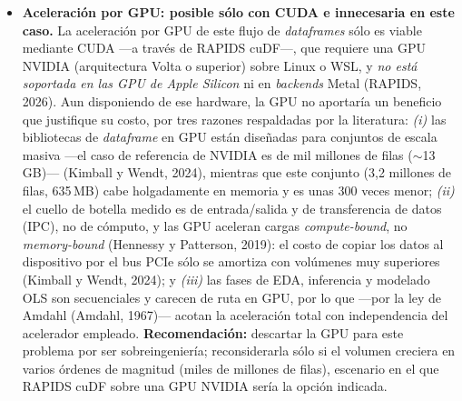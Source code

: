 \documentclass[12pt,letterpaper]{article}
\begin{document}
\begin{itemize}
    \item \textbf{Aceleración por GPU: posible sólo con CUDA e innecesaria en este caso.} La aceleración por GPU de este flujo de \textit{dataframes} sólo es viable mediante CUDA —a través de RAPIDS cuDF—, que requiere una GPU NVIDIA (arquitectura Volta o superior) sobre Linux o WSL, y \textit{no está soportada en las GPU de Apple Silicon} ni en \textit{backends} Metal (RAPIDS, 2026). Aun disponiendo de ese hardware, la GPU no aportaría un beneficio que justifique su costo, por tres razones respaldadas por la literatura: \textit{(i)} las bibliotecas de \textit{dataframe} en GPU están diseñadas para conjuntos de escala masiva —el caso de referencia de NVIDIA es de mil millones de filas ($\sim$13\,GB)— (Kimball y Wendt, 2024), mientras que este conjunto (3,2 millones de filas, 635\,MB) cabe holgadamente en memoria y es unas 300 veces menor; \textit{(ii)} el cuello de botella medido es de entrada/salida y de transferencia de datos (IPC), no de cómputo, y las GPU aceleran cargas \textit{compute-bound}, no \textit{memory-bound} (Hennessy y Patterson, 2019): el costo de copiar los datos al dispositivo por el bus PCIe sólo se amortiza con volúmenes muy superiores (Kimball y Wendt, 2024); y \textit{(iii)} las fases de EDA, inferencia y modelado OLS son secuenciales y carecen de ruta en GPU, por lo que —por la ley de Amdahl (Amdahl, 1967)— acotan la aceleración total con independencia del acelerador empleado. \textbf{Recomendación:} descartar la GPU para este problema por ser sobreingeniería; reconsiderarla sólo si el volumen creciera en varios órdenes de magnitud (miles de millones de filas), escenario en el que RAPIDS cuDF sobre una GPU NVIDIA sería la opción indicada.
\end{itemize}
\end{document}
